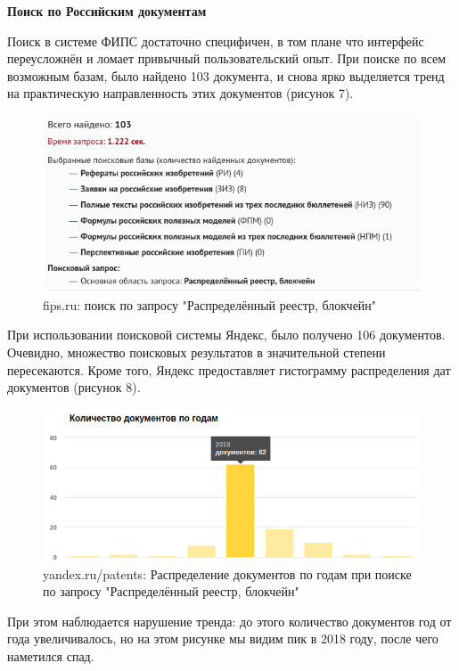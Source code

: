 \documentclass[a4paper, 12pt]{report}		%
\begin{document}
\textbf{Поиск по Российским документам}


Поиск в системе ФИПС достаточно специфичен, в том плане что интерфейс переусложнён и ломает привычный пользовательский опыт. При поиске по всем возможным базам, было найдено 103 документа, и снова ярко выделяется тренд на практическую направленность этих документов (рисунок 7).


\begin{figure}[H]
 \centering
 \includegraphics[scale=0.6]{res/fisp}
 \caption{fips.ru: поиск по запросу "Распределённый реестр, блокчейн"}
\end{figure}


При использовании поисковой системы Яндекс, было получено 106 документов. Очевидно, множество поисковых результатов в значительной степени пересекаются. Кроме того, Яндекс предоставляет гистограмму распределения дат документов (рисунок 8).


\begin{figure}[H]
 \centering
 \includegraphics[scale=0.6]{res/yandex}
 \caption{yandex.ru/patents: Распределение документов по годам при поиске по запросу "Распределённый реестр, блокчейн"}
\end{figure}


При этом наблюдается нарушение тренда: до этого количество документов год от года увеличивалось, но на этом рисунке мы видим пик в 2018 году, после чего наметился спад.
\end{document}
